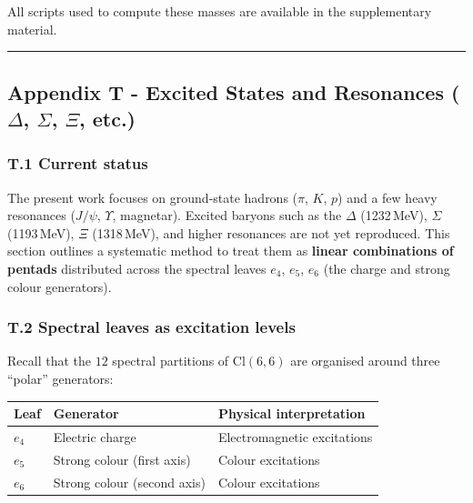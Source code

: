 \documentclass[11pt]{article}
\begin{document}
All scripts used to compute these masses are available in the
supplementary material.

\begin{center}\rule{0.5\linewidth}{0.5pt}\end{center}

\hypertarget{appendix-t---excited-states-and-resonances-delta-sigma-xi-etc.}{%
\subsection{\texorpdfstring{Appendix T - Excited States and Resonances
(\(\Delta\), \(\Sigma\), \(\Xi\),
etc.)}{Appendix T - Excited States and Resonances (\textbackslash Delta, \textbackslash Sigma, \textbackslash Xi, etc.)}}\label{appendix-t---excited-states-and-resonances-delta-sigma-xi-etc.}}

\hypertarget{t.1-current-status}{%
\subsubsection{T.1 Current status}\label{t.1-current-status}}

The present work focuses on ground‑state hadrons (\(\pi\), \(K\), \(p\))
and a few heavy resonances (\(J/\psi\), \(\Upsilon\), magnetar). Excited
baryons such as the \(\Delta\) (1232\,MeV), \(\Sigma\) (1193\,MeV),
\(\Xi\) (1318\,MeV), and higher resonances are not yet reproduced. This
section outlines a systematic method to treat them as \textbf{linear
combinations of pentads} distributed across the spectral leaves \(e_4\),
\(e_5\), \(e_6\) (the charge and strong colour generators).

\hypertarget{t.2-spectral-leaves-as-excitation-levels}{%
\subsubsection{T.2 Spectral leaves as excitation
levels}\label{t.2-spectral-leaves-as-excitation-levels}}

Recall that the \(12\) spectral partitions of \(\mathrm{Cl}(6,6)\) are
organised around three ``polar'' generators:

\begin{longtable}[]{@{}lll@{}}
\toprule
Leaf & Generator & Physical interpretation \\
\midrule
\endhead
\(e_4\) & Electric charge & Electromagnetic excitations \\
\(e_5\) & Strong colour (first axis) & Colour excitations \\
\(e_6\) & Strong colour (second axis) & Colour excitations \\
\bottomrule
\end{longtable}
\end{document}
